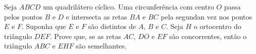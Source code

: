 Seja $ABCD$ um quadrilátero cíclico.
Uma circunferência com centro $O$ passa pelos pontos $B$ e $D$ e intersecta as retas $BA$ e $BC$ pela segundan vez nos pontos $E$ e $F$. Suponha que $E$ e $F$ são distintos de $A$, $B$ e $C$. Seja $H$ o ortocentro do triângulo $DEF.$ Prove que, se as retas $AC$, $DO$ e $EF$ são concorrentes, então o triângulo $ABC$ e $EHF$ são semelhantes.
